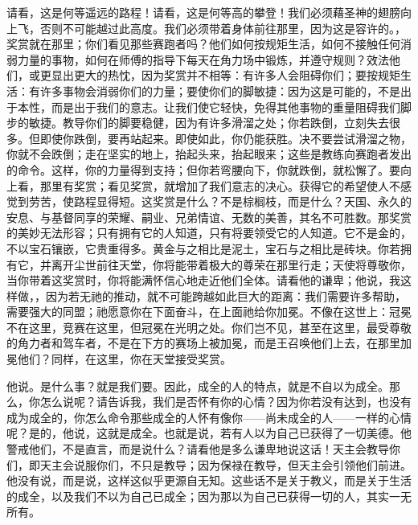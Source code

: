 请看，这是何等遥远的路程！请看，这是何等高的攀登！我们必须藉圣神的翅膀向上飞，否则不可能越过此高度。我们必须带着身体前往那里，因为这是容许的。，奖赏就在那里；你们看见那些赛跑者吗？他们如何按规矩生活，如何不接触任何消弱力量的事物，如何在师傅的指导下每天在角力场中锻炼，并遵守规则？效法他们，或更显出更大的热忱，因为奖赏并不相等：有许多人会阻碍你们；要按规矩生活：有许多事物会消弱你们的力量；要使你们的脚敏捷：因为这是可能的，不是出于本性，而是出于我们的意志。让我们使它轻快，免得其他事物的重量阻碍我们脚步的敏捷。教导你们的脚要稳健，因为有许多滑溜之处；你若跌倒，立刻失去很多。但即使你跌倒，要再站起来。即使如此，你仍能获胜。决不要尝试滑溜之物，你就不会跌倒；走在坚实的地上，抬起头来，抬起眼来；这些是教练向赛跑者发出的命令。这样，你的力量得到支持；但你若弯腰向下，你就跌倒，就松懈了。要向上看，那里有奖赏；看见奖赏，就增加了我们意志的决心。获得它的希望使人不感觉到劳苦，使路程显得短。这奖赏是什么？不是棕榈枝，而是什么？天国、永久的安息、与基督同享的荣耀、嗣业、兄弟情谊、无数的美善，其名不可胜数。那奖赏的美妙无法形容；只有拥有它的人知道，只有将要领受它的人知道。它不是金的，不以宝石镶嵌，它贵重得多。黄金与之相比是泥土，宝石与之相比是砖块。你若拥有它，并离开尘世前往天堂，你将能带着极大的尊荣在那里行走；天使将尊敬你，当你带着这奖赏时，你将能满怀信心地走近他们全体。请看他的谦卑；他说，我这样做，，因为若无祂的推动，就不可能跨越如此巨大的距离：我们需要许多帮助，需要强大的同盟；祂愿意你在下面奋斗，在上面祂给你加冕。不像在这世上：冠冕不在这里，竞赛在这里，但冠冕在光明之处。你们岂不见，甚至在这里，最受尊敬的角力者和驾车者，不是在下方的赛场上被加冕，而是王召唤他们上去，在那里加冕他们？同样，在这里，你在天堂接受奖赏。\par

他说。是什么事？就是我们要。因此，成全的人的特点，就是不自以为成全。那么，你怎么说呢？请告诉我，我们是否怀有你的心情？因为你若没有达到，也没有成为成全的，你怎么命令那些成全的人怀有像你——尚未成全的人——一样的心情呢？是的，他说，这就是成全。也就是说，若有人以为自己已获得了一切美德。他警戒他们，不是直言，而是说什么？请看他是多么谦卑地说这话！天主会教导你们，即天主会说服你们，不只是教导；因为保禄在教导，但天主会引领他们前进。他没有说，而是说，这样这似乎更源自无知。这些话不是关于教义，而是关于生活的成全，以及我们不以为自己已成全；因为那以为自己已获得一切的人，其实一无所有。\par

